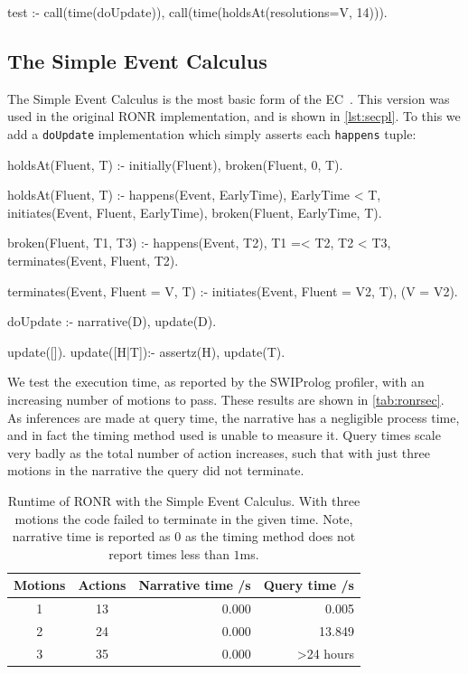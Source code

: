\begin{prologinline}
test :-
	call(time(doUpdate)),
	call(time(holdsAt(resolutions=V, 14))).
\end{prologinline}

\subsection{The Simple Event Calculus}

The Simple Event Calculus is the most basic form of the \ac{EC}~\citep{Shanahan1999}.
This version was used in the original \ac{RONR} implementation, and is shown in \autoref{lst:secpl}. To this we add a \texttt{doUpdate} implementation which simply asserts each
\texttt{happens} tuple:

\begin{prolog}[caption=Prolog implementation of the Simple Event Calculus,label=lst:secpl]
holdsAt(Fluent, T) :-
	initially(Fluent),
	\+ broken(Fluent, 0, T).

holdsAt(Fluent, T) :-
	happens(Event, EarlyTime),
	EarlyTime < T,
	initiates(Event, Fluent, EarlyTime),
	\+ broken(Fluent, EarlyTime, T).

broken(Fluent, T1, T3) :-
	happens(Event, T2),
	T1 =< T2,
	T2 < T3,
	terminates(Event, Fluent, T2).

terminates(Event, Fluent = V, T) :-
	initiates(Event, Fluent = V2, T),
	\+ (V = V2).
\end{prolog}

\begin{prologinline}
doUpdate :-
	narrative(D),
	update(D).

update([]).
update([H|T]):-
	assertz(H),
	update(T).
\end{prologinline}

We test the execution time, as reported by the SWIProlog profiler, with
an increasing number of motions to pass. These results are shown in \autoref{tab:ronrsec}.
As inferences are made at query time, the narrative has a negligible process
time, and in fact the timing method used is unable to measure it. Query times scale very badly as the total number of action increases, such
that with just three motions in the narrative the query did not terminate.

\begin{table}
\caption[Runtime of RONR with the Simple Event Calculus]{Runtime of RONR with the Simple Event Calculus. With three motions the
code failed to terminate in the given time. Note, narrative time is reported as 0 as the timing method does not report times less than $1$ms.}\label{tab:ronrsec}
\centering
\begin{tabular}{c|c|r|r}
Motions & Actions & Narrative time /s & Query time /s \\ \hline
1 & 13 & 0.000 & 0.005 \\
2 & 24 & 0.000 & 13.849 \\
3 & 35 & 0.000 & >24 hours \\
\end{tabular}
\end{table}

